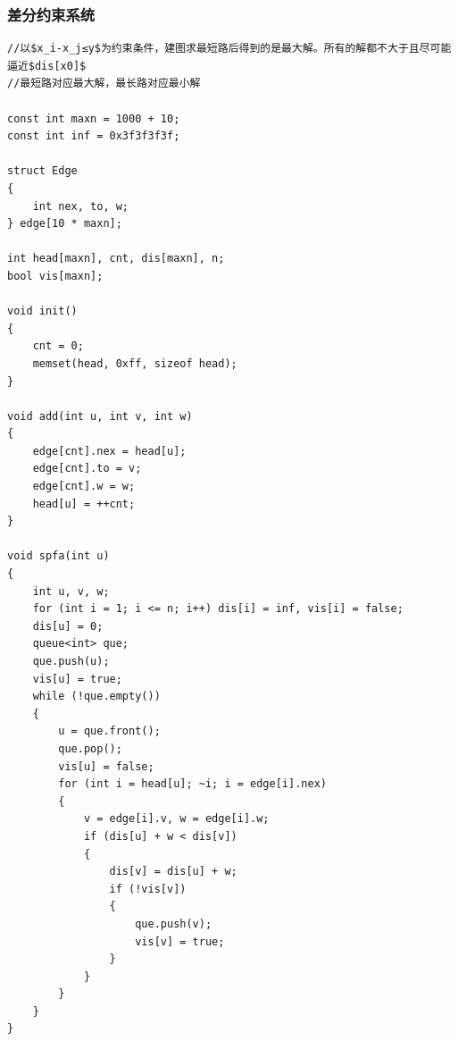\documentclass[twoside]{article}
\begin{document}
\subsubsection{差分约束系统}
\begin{lstlisting}
//以$x_i-x_j≤y$为约束条件，建图求最短路后得到的是最大解。所有的解都不大于且尽可能逼近$dis[x0]$
//最短路对应最大解，最长路对应最小解

const int maxn = 1000 + 10;
const int inf = 0x3f3f3f3f;

struct Edge
{
    int nex, to, w;
} edge[10 * maxn];

int head[maxn], cnt, dis[maxn], n;
bool vis[maxn];

void init()
{
    cnt = 0;
    memset(head, 0xff, sizeof head);
}

void add(int u, int v, int w)
{
    edge[cnt].nex = head[u];
    edge[cnt].to = v;
    edge[cnt].w = w;
    head[u] = ++cnt;
}

void spfa(int u)
{
    int u, v, w;
    for (int i = 1; i <= n; i++) dis[i] = inf, vis[i] = false;
    dis[u] = 0;
    queue<int> que;
    que.push(u);
    vis[u] = true;
    while (!que.empty())
    {
        u = que.front();
        que.pop();
        vis[u] = false;
        for (int i = head[u]; ~i; i = edge[i].nex)
        {
            v = edge[i].v, w = edge[i].w;
            if (dis[u] + w < dis[v])
            {
                dis[v] = dis[u] + w;
                if (!vis[v])
                {
                    que.push(v);
                    vis[v] = true;
                }
            }
        }
    }
}\end{lstlisting}
\end{document}
